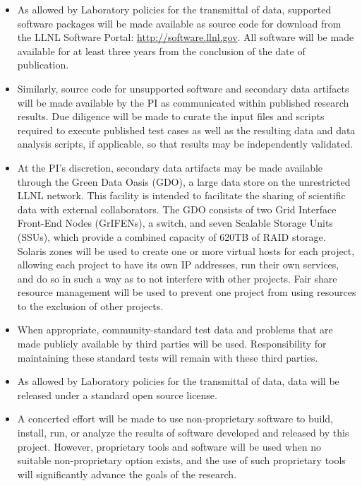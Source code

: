 \documentclass[11pt]{article}
\begin{document}
\begin{itemize}
\item As allowed by Laboratory policies for the transmittal of data, supported
  software packages will be made available as source code for download from the
  LLNL Software Portal: \url{http://software.llnl.gov}. All software will be
  made available for at least three years from the conclusion of the date of
  publication.
\item Similarly, source code for unsupported software and secondary data
  artifacts will be made available by the PI as communicated within published
  research results. Due diligence will be made to curate the input files and
  scripts required to execute published test cases as well as the resulting data
  and data analysis scripts, if applicable, so that results may be independently
  validated.
\item At the PI's discretion, secondary data artifacts may be made available
  through the Green Data Oasis (GDO), a large data store on the unrestricted
  LLNL network. This facility is intended to facilitate the sharing of
  scientific data with external collaborators. The GDO consists of two Grid
  Interface Front-End Nodes (GrIFENs), a switch, and seven Scalable Storage
  Units (SSUs), which provide a combined capacity of 620TB of RAID storage.
  Solaris zones will be used to create one or more virtual hosts for each
  project, allowing each project to have its own IP addresses, run their own
  services, and do so in such a way as to not interfere with other projects.
  Fair share resource management will be used to prevent one project from using
  resources to the exclusion of other projects.
\item When appropriate, community-standard test data and problems that are made
  publicly available by third parties will be used. Responsibility for
  maintaining these standard tests will remain with these third parties.
\item As allowed by Laboratory policies for the transmittal of data, data will
  be released under a standard open source license.
\item A concerted effort will be made to use non-proprietary software to build,
  install, run, or analyze the results of software developed and released by
  this project. However, proprietary tools and software will be used when no
  suitable non-proprietary option exists, and the use of such proprietary tools
  will significantly advance the goals of the research.

\end{itemize}
\end{document}
